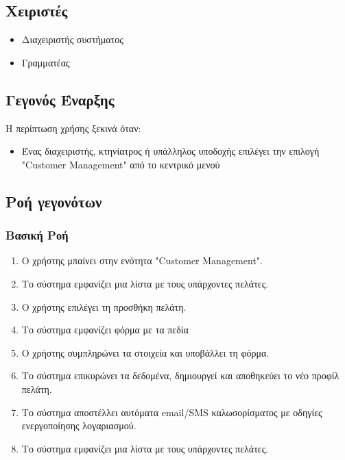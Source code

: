 \documentclass[12pt,a4paper,twoside]{book}
\begin{document}
\subsection{Χειριστές}
\begin{itemize}
  \item Διαχειριστής συστήματος
  \item Γραμματέας
\end{itemize}

\subsection{Γεγονός Έναρξης}
Η περίπτωση χρήσης ξεκινά όταν:
\begin{itemize}
  \item Ένας διαχειριστής, κτηνίατρος ή υπάλληλος υποδοχής επιλέγει την επιλογή "Customer Management" από το κεντρικό μενού %
\end{itemize}

\subsection{Ροή γεγονότων}

\subsubsection{Βασική Ροή}
\begin{enumerate}
  \item Ο χρήστης μπαίνει στην ενότητα "Customer Management". %
  \item Το σύστημα εμφανίζει μια λίστα με τους υπάρχοντες πελάτες.
  \item Ο χρήστης επιλέγει τη προσθήκη πελάτη.
  \item Το σύστημα εμφανίζει φόρμα με τα πεδία %
  \item Ο χρήστης συμπληρώνει τα στοιχεία και υποβάλλει τη φόρμα.
  \item Το σύστημα επικυρώνει τα δεδομένα, δημιουργεί και αποθηκεύει το νέο προφίλ πελάτη. %
  \item Το σύστημα αποστέλλει αυτόματα email/SMS καλωσορίσματος με οδηγίες ενεργοποίησης λογαριασμού. %
  \item Το σύστημα εμφανίζει μια λίστα με τους υπάρχοντες πελάτες.
\end{enumerate}
\end{document}
